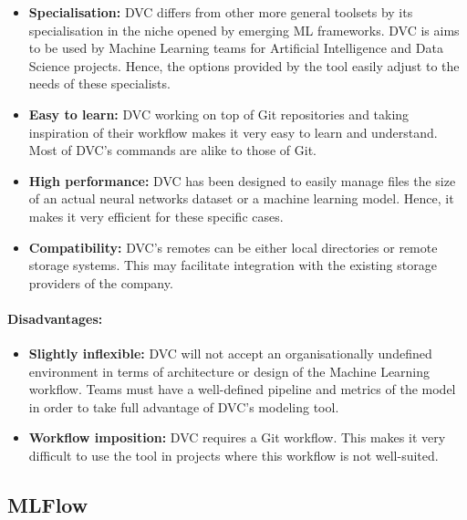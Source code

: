 \begin{itemize}
    \item \textbf{Specialisation: } DVC differs from other more general toolsets by its specialisation in the niche opened by emerging ML frameworks. DVC is aims to be used 
    by Machine Learning teams for Artificial Intelligence and Data Science projects. Hence, the options provided by the tool easily adjust to the needs of these specialists.

    \item \textbf{Easy to learn: } DVC working on top of Git repositories and taking inspiration of their workflow makes it very easy to learn and understand. Most of DVC's 
    commands are alike to those of Git.

    \item \textbf{High performance: } DVC has been designed to easily manage files the size of an actual neural networks dataset or a machine learning model. Hence, it makes
    it very efficient for these specific cases.

    \item \textbf{Compatibility: } DVC's remotes can be either local directories or remote storage systems. This may facilitate integration with the existing storage providers
    of the company.

\end{itemize}

\paragraph{Disadvantages:\cite{dvcoverview}}

\begin{itemize}
    \item \textbf{Slightly inflexible: } DVC will not accept an organisationally undefined environment in terms of architecture or design of the Machine Learning workflow. Teams must have a 
    well-defined pipeline and metrics of the model in order to take full advantage of DVC's modeling tool.

    \item \textbf{Workflow imposition: } DVC requires a Git workflow. This makes it very difficult to use the tool in projects where this workflow is not well-suited.

\end{itemize}

\subsection{MLFlow}\label{sec:mlflow}

